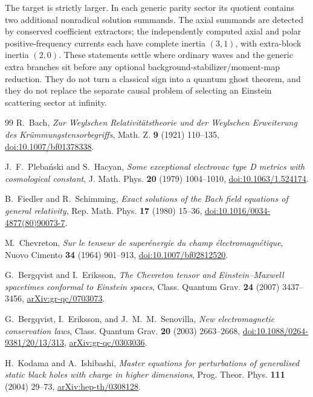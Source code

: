 \documentclass[11pt]{article}
\theoremstyle{remark}
\begin{document}
The target is strictly larger. In each generic parity sector its quotient
contains two additional nonradical solution summands. The axial summands are
detected by conserved coefficient extractors; the independently computed
axial and polar positive-frequency currents each have complete inertia
$(3,1)$, with extra-block inertia $(2,0)$.
These statements settle where ordinary waves and the generic extra branches
sit before any optional background-stabilizer/moment-map reduction. They do
not turn a classical sign
into a quantum ghost theorem, and they do not replace the separate causal
problem of selecting an Einstein scattering sector at infinity.

\begin{thebibliography}{99}
R.~Bach,
\emph{Zur Weylschen Relativit\"atstheorie und der Weylschen Erweiterung des
Kr\"ummungstensorbegriffs},
Math. Z. \textbf{9} (1921) 110--135,
\href{https://doi.org/10.1007/bf01378338}{doi:10.1007/bf01378338}.

J.~F.~Pleba\'nski and S.~Hacyan,
\emph{Some exceptional electrovac type D metrics with cosmological constant},
J. Math. Phys. \textbf{20} (1979) 1004--1010,
\href{https://doi.org/10.1063/1.524174}{doi:10.1063/1.524174}.

B.~Fiedler and R.~Schimming,
\emph{Exact solutions of the Bach field equations of general relativity},
Rep. Math. Phys. \textbf{17} (1980) 15--36,
\href{https://doi.org/10.1016/0034-4877(80)90073-7}%
{doi:10.1016/0034-4877(80)90073-7}.

M.~Chevreton,
\emph{Sur le tenseur de super\'energie du champ \'electromagn\'etique},
Nuovo Cimento \textbf{34} (1964) 901--913,
\href{https://doi.org/10.1007/bf02812520}{doi:10.1007/bf02812520}.

G.~Bergqvist and I.~Eriksson,
\emph{The Chevreton tensor and Einstein--Maxwell spacetimes conformal to
Einstein spaces},
Class. Quantum Grav. \textbf{24} (2007) 3437--3456,
\href{https://arxiv.org/abs/gr-qc/0703073}{arXiv:gr-qc/0703073}.

G.~Bergqvist, I.~Eriksson, and J.~M.~M.~Senovilla,
\emph{New electromagnetic conservation laws},
Class. Quantum Grav. \textbf{20} (2003) 2663--2668,
\href{https://doi.org/10.1088/0264-9381/20/13/313}%
{doi:10.1088/0264-9381/20/13/313},
\href{https://arxiv.org/abs/gr-qc/0303036}{arXiv:gr-qc/0303036}.

H.~Kodama and A.~Ishibashi,
\emph{Master equations for perturbations of generalised static black holes
with charge in higher dimensions},
Prog. Theor. Phys. \textbf{111} (2004) 29--73,
\href{https://arxiv.org/abs/hep-th/0308128}{arXiv:hep-th/0308128}.


\end{thebibliography}
\end{document}
